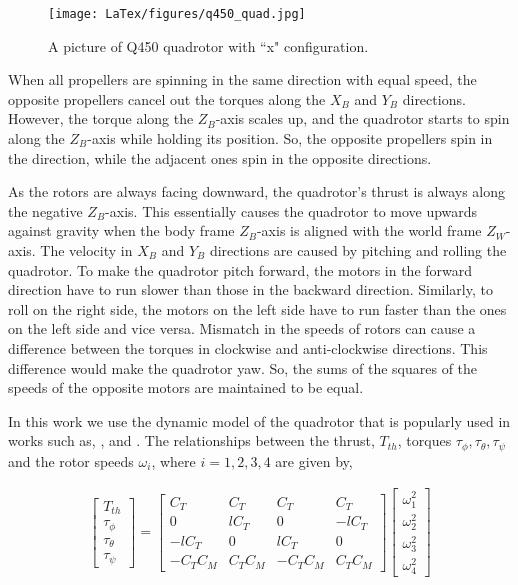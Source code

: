 \begin{figure}
	\centering
	\texttt{[image: LaTex/figures/q450\_quad.jpg]}
	\caption{{A picture of Q450 quadrotor with ``x" configuration.}}\label{fig:q450_quad}
\end{figure}

When all propellers are spinning in the same direction with equal speed, the opposite propellers cancel out the torques along the $X_B$ and $Y_B$ directions. However, the torque along the $Z_B$-axis scales up, and the quadrotor starts to spin along the $Z_B$-axis while holding its position. So, the opposite propellers spin in the direction, while the adjacent ones spin in the opposite directions.

As the rotors are always facing downward, the quadrotor's thrust is always along the negative $Z_B$-axis. This essentially causes the quadrotor to move upwards against gravity when the body frame $Z_B$-axis is aligned with the world frame $Z_W$-axis. The velocity in $X_B$ and $Y_B$ directions are caused by pitching and rolling the quadrotor. To make the quadrotor pitch forward, the motors in the forward direction have to run slower than those in the backward direction. Similarly, to roll on the right side, the motors on the left side have to run faster than the ones on the left side and vice versa. Mismatch in the speeds of rotors can cause a difference between the torques in clockwise and anti-clockwise directions. This difference would make the quadrotor yaw. So, the sums of the squares of the speeds of the opposite motors are maintained to be equal.

In this work we use the dynamic model of the quadrotor that is popularly used in works such as, \cite{lee2010geometric}, \cite{rotors_sim_2016} and \cite{mellinger2014traj}. The relationships between the thrust, $T_{th}$, torques $\tau_{\phi}, \tau_{\theta}, \tau_{\psi}$ and the rotor speeds $\omega_i$, where $i = 1,2,3,4$ are given by,

\begin{align}
    \begin{bmatrix}
        T_{th} \\ \tau_{\phi} \\ \tau_{\theta} \\ \tau_{\psi}
    \end{bmatrix} =
    \begin{bmatrix}
        C_T & C_T & C_T & C_T \\
        0 & lC_T & 0 & -lC_T \\
        -lC_T & 0 & lC_T & 0 \\
        -C_TC_M & C_TC_M & -C_TC_M & C_TC_M
    \end{bmatrix}
    \begin{bmatrix}
        \omega^2_1 \\
        \omega^2_2 \\
        \omega^2_3 \\
        \omega^2_4 
    \end{bmatrix}
\end{align}

